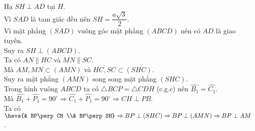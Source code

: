 \begin{ex}
{\begin{center}
\begin{tikzpicture}[scale=0.7, font=\footnotesize, line join=round, line cap=round, >=stealth]
		\end{tikzpicture}
	\end{center}
	Hạ $SH\perp AD$ tại $H$.\\
	Vì $SAD$ là tam giác đều nên $SH=\dfrac{a\sqrt{3}}{2}$.\\
	Vì mặt phẳng $\left(SAD\right)$ vuông góc mặt phẳng $\left(ABCD\right)$ nên có $AD$ là giao tuyến.\\
	Suy ra $SH\perp (ABCD)$.\\
	Ta có $AN\parallel HC$ và $MN\parallel SC$.\\
	Mà $AM,MN\subset (AMN)$ và $HC,SC\subset \left(SHC\right)$.\\
	Suy ra mặt phẳng $\left(AMN\right)$ song song mặt phẳng $\left(SHC\right)$.\\
	Trong hình vuông $ABCD$ ta có $\triangle BCP=\triangle CDH$ (c.g.c) nên $\widehat{B_1}=\widehat{C_1}$.\\
	Mà $\widehat{B_1}+\widehat{P_1}=90^{\circ}\Rightarrow \widehat{C_1}+\widehat{P_1}=90^{\circ}\Rightarrow CH\perp PB$.\\
	Ta có $\heva{& BP\perp CH \\& BP\perp SH}\Rightarrow BP\perp \left(SHC\right)\Rightarrow BP\perp \left(AMN\right)\Rightarrow BP\perp AM$.
	}
\end{ex}


%

